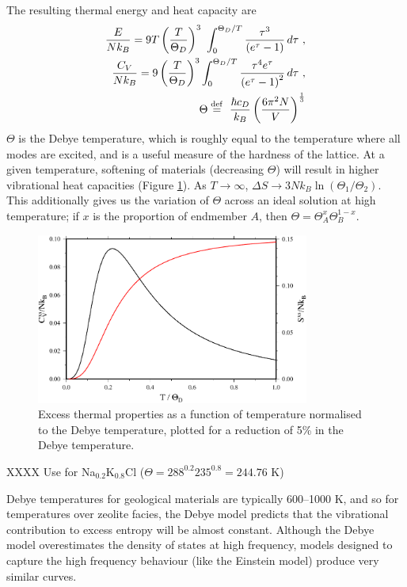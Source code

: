 The resulting thermal energy and heat capacity are
\begin{eqnarray}
\frac{E}{Nk_B} = 9 T \left({T\over \Theta_D}\right)^3\ \int_0^{\Theta_D/T} {\tau^3 \over \left(e^\tau-1\right)}\, d\tau\ ,\\
\frac{C_V}{Nk_B} = 9 \left({T\over \Theta_D}\right)^3\int_0^{\Theta_D/T} {\tau^4 e^\tau\over\left(e^\tau-1\right)^2}\, d\tau\ ,\\
\Theta \stackrel{\mathrm{def}}{=}\  {\hbar c_D \over k_B} \left( {6 \pi^2 N \over V} \right)^{1\over3} \label{debye}
\end{eqnarray}
\noindent $\Theta$ is the Debye temperature, which is roughly equal to the temperature where all modes are excited, and is a useful measure of the hardness of the lattice. At a given temperature, softening of materials (decreasing $\Theta$) will result in higher vibrational heat capacities (Figure \ref{fig:debye_excesses}). As $T \rightarrow \infty$, $\Delta S \rightarrow 3Nk_B\ln (\Theta_{1} / \Theta_{2})$. This additionally gives us the variation of $\Theta$ across an ideal solution at high temperature; if $x$ is the proportion of endmember $A$, then $\Theta = \Theta_A^x \Theta_B^{1-x}$.



\begin{figure}[ht!]
  \centering
  \includegraphics[width=0.8\textwidth]{figures/debye_excesses}
  \caption{Excess thermal properties as a function of temperature normalised to the Debye temperature, plotted for a reduction of 5\% in the Debye temperature.}
  \label{fig:debye_excesses}
\end{figure}

XXXX Use\cite{BD2013} for Na$_{0.2}$K$_{0.8}$Cl ($\Theta = 288^{0.2} 235^{0.8} = 244.76$ K)

Debye temperatures for geological materials are typically 600--1000 K, and so for temperatures over zeolite facies, the Debye model predicts that the vibrational contribution to excess entropy will be almost constant. Although the Debye model overestimates the density of states at high frequency, models designed to capture the high frequency behaviour (like the Einstein model) produce very similar curves. 

